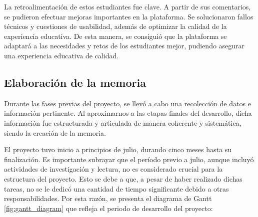 La retroalimentación de estos estudiantes fue clave. A partir de sus comentarios, se pudieron efectuar mejoras importantes en la plataforma. Se solucionaron fallos técnicos y cuestiones de usabilidad, además de optimizar la calidad de la experiencia educativa. De esta manera, se consiguió que la plataforma se adaptará a las necesidades y retos de los estudiantes mejor, pudiendo asegurar una experiencia educativa de calidad.

\subsection{Elaboración de la memoria}

Durante las fases previas del proyecto, se llevó a cabo una recolección de datos e información pertinente. Al aproximarnos a las etapas finales del desarrollo, dicha información fue estructurada y articulada de manera coherente y sistemática, siendo la creación de la memoria.

El proyecto tuvo inicio a principios de julio, durando cinco meses hasta su finalización. Es importante subrayar que el período previo a julio, aunque incluyó actividades de investigación y lectura, no es considerado crucial para la estructura del proyecto. Esto se debe a que, a pesar de haber realizado dichas tareas, no se le dedicó una cantidad de tiempo significante debido a otras responsabilidades. Por esta razón, se presenta el diagrama de Gantt \ref{fig:gantt_diagram} que refleja el periodo de desarrollo del proyecto:

